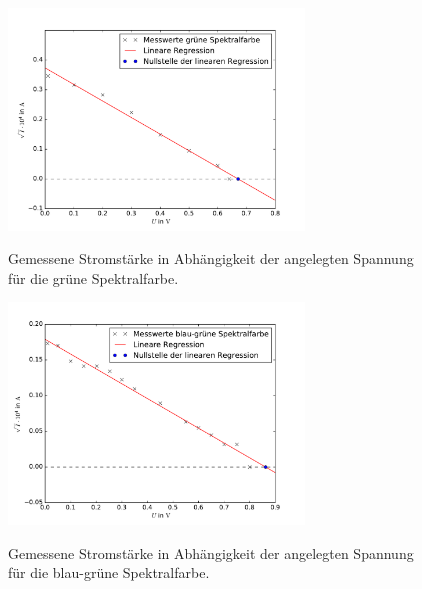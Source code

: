 \newpage




\begin{figure}
  \centering
  \includegraphics[width = 0.7\textwidth]{Pics/gruene_Spektrallinie.pdf}\\[0cm]
  \caption{Gemessene Stromstärke in Abhängigkeit der angelegten Spannung für die
           grüne Spektralfarbe.}
  \label{fig:Gruen}
\end{figure}

\newpage



\begin{figure}
  \centering
  \includegraphics[width = 0.7\textwidth]{Pics/blau_gruene_Spektrallinie.pdf}\\[0cm]
  \caption{Gemessene Stromstärke in Abhängigkeit der angelegten Spannung für die
           blau-grüne Spektralfarbe.}
  \label{fig:BlauGruen}
\end{figure}

\newpage



